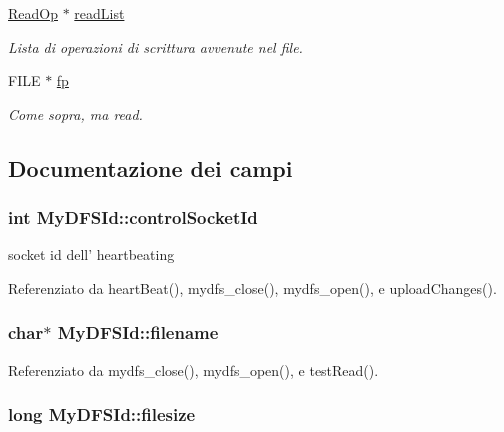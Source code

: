 \begin{DoxyCompactItemize}
\hyperlink{structReadOp}{Read\+Op} $\ast$ \hyperlink{structMyDFSId_a8a4360512d45c22b6d8e980967c7dd32}{read\+List}
\begin{DoxyCompactList}\small\item\em Lista di operazioni di scrittura avvenute nel file. \end{DoxyCompactList}\item 
F\+I\+L\+E $\ast$ \hyperlink{structMyDFSId_ae2badd91d3b506420a9e49554df8212d}{fp}
\begin{DoxyCompactList}\small\item\em Come sopra, ma read. \end{DoxyCompactList}\end{DoxyCompactItemize}


\subsection{Documentazione dei campi}
\hypertarget{structMyDFSId_a4b67c0973fca25c75395e001b0bf8fc7}{
\subsubsection[{control\+Socket\+Id}]{\setlength{\rightskip}{0pt plus 5cm}int My\+D\+F\+S\+Id\+::control\+Socket\+Id}}\label{structMyDFSId_a4b67c0973fca25c75395e001b0bf8fc7}


socket id dell' heartbeating 



Referenziato da heart\+Beat(), mydfs\+\_\+close(), mydfs\+\_\+open(), e upload\+Changes().

\hypertarget{structMyDFSId_ac0e1b8c96d859982c1a7d49f9e929e48}{
\subsubsection[{filename}]{\setlength{\rightskip}{0pt plus 5cm}char$\ast$ My\+D\+F\+S\+Id\+::filename}}\label{structMyDFSId_ac0e1b8c96d859982c1a7d49f9e929e48}


Referenziato da mydfs\+\_\+close(), mydfs\+\_\+open(), e test\+Read().

\hypertarget{structMyDFSId_a394540d568f1fa235d096fd790d2891f}{
\subsubsection[{filesize}]{\setlength{\rightskip}{0pt plus 5cm}long My\+D\+F\+S\+Id\+::filesize}}\label{structMyDFSId_a394540d568f1fa235d096fd790d2891f}


